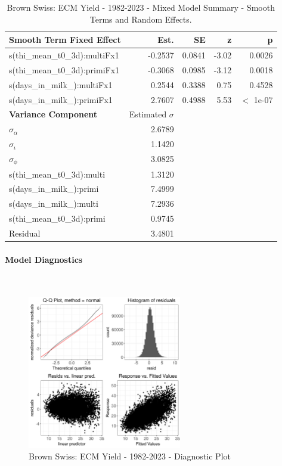 \newpage
\begin{table}[H]
\centering
\begin{tabular}
{l | r | r | r | r}
\textbf{Smooth Term Fixed Effect} & Est. & SE & z & p\\
\hline
\hline
s(thi\_mean\_t0\_3d):multiFx1& -0.2537 & 0.0841 & -3.02 & 0.0026\\
s(thi\_mean\_t0\_3d):primiFx1 & -0.3068 & 0.0985 & -3.12 & 0.0018\\
s(days\_in\_milk\_):multiFx1 & 0.2544 & 0.3388 & 0.75 & 0.4528\\
s(days\_in\_milk\_):primiFx1 & 2.7607 & 0.4988 & 5.53 & $<$ 1e-07\\
\hline
\textbf{Variance Component} & Estimated $\sigma$ & & & \\
\hline
\hline
$\sigma_\alpha$ & 2.6789 & &  & \\
$\sigma_\iota$ & 1.1420 & & & \\
$\sigma_\phi$ & 3.0825 & & & \\
s(thi\_mean\_t0\_3d):multi & 1.3120 & & & \\
s(days\_in\_milk\_):primi & 7.4999 & & & \\
s(days\_in\_milk\_):multi & 7.2936 & & & \\
s(thi\_mean\_t0\_3d):primi & 0.9745 & & & \\
Residual & 3.4801 & & & \\
\end{tabular}
\caption[]{Brown Swiss: ECM Yield - 1982-2023 - Mixed Model Summary - Smooth Terms and Random Effects.}
\end{table}



\paragraph{Model Diagnostics} \quad \\
\begin{figure}[H]
    \centering
    \includegraphics[width=0.6\textwidth]{thesis/figures/models/ecm/full/bs_ecm_full/bs_ecm_full_diagnostics.png}
    \caption[]{Brown Swiss: ECM Yield - 1982-2023 - Diagnostic Plot}
\end{figure}

